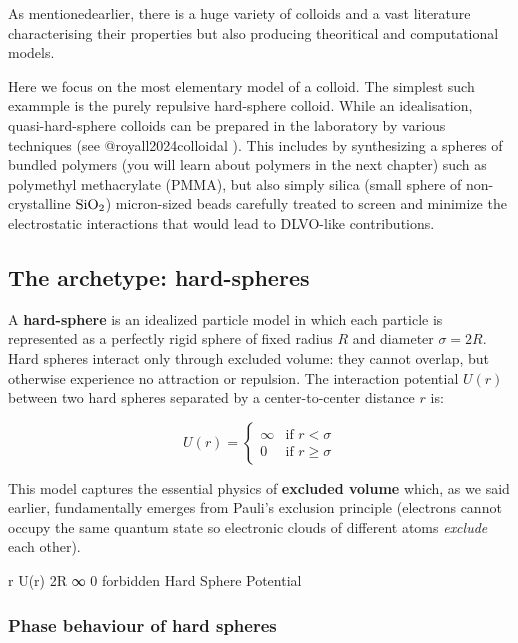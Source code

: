 \documentclass[
  letterpaper,
  enabledeprecatedfontcommands]{report}
\begin{document}
As mentionedearlier, there is a huge variety of colloids and a vast
literature characterising their properties but also producing
theoritical and computational models.

Here we focus on the most elementary model of a colloid. The simplest
such exammple is the purely repulsive hard-sphere colloid. While an
idealisation, quasi-hard-sphere colloids can be prepared in the
laboratory by various techniques (see @royall2024colloidal ). This
includes by synthesizing a spheres of bundled polymers (you will learn
about polymers in the next chapter) such as polymethyl methacrylate
(PMMA), but also simply silica (small sphere of non-crystalline
\(\rm Si O_2\)) micron-sized beads carefully treated to screen and
minimize the electrostatic interactions that would lead to DLVO-like
contributions.

\subsection{The archetype: hard-spheres}\label{sec-hard-spheres}

A \textbf{hard-sphere} is an idealized particle model in which each
particle is represented as a perfectly rigid sphere of fixed radius
\(R\) and diameter \(\sigma=2R\). Hard spheres interact only through
excluded volume: they cannot overlap, but otherwise experience no
attraction or repulsion. The interaction potential \(U(r)\) between two
hard spheres separated by a center-to-center distance \(r\) is:

\[
U(r) = \begin{cases}
\infty & \text{if } r < \sigma \\
0 & \text{if } r \geq \sigma
\end{cases}
\]

This model captures the essential physics of \textbf{excluded volume}
which, as we said earlier, fundamentally emerges from Pauli's exclusion
principle (electrons cannot occupy the same quantum state so electronic
clouds of different atoms \emph{exclude} each other).

r U(r) 2R ∞ 0 forbidden Hard Sphere Potential

\subsubsection*{Phase behaviour of hard
spheres}\label{phase-behaviour-of-hard-spheres}
\end{document}
